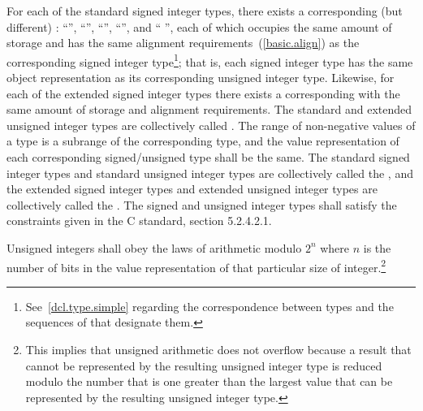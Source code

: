 \pnum
{}%
For each of the standard signed integer types,
there exists a corresponding (but different)
%
%
:
%
%
%
%
%
``'', ``'',
``'', ``'', and
``   '', each of
which occupies the same amount of storage and has the same alignment
requirements~(\ref{basic.align}) as the corresponding signed integer
type\footnote{See~\ref{dcl.type.simple} regarding the correspondence between types and
the sequences of  that designate them.};
that is, each signed integer type has the same object representation as
its corresponding unsigned integer type.
%
%
%
%
Likewise, for each of the extended signed integer types there exists a
corresponding  with the same amount of storage and alignment
requirements. The standard and extended unsigned integer types are
collectively called . The range of non-negative
values of a  type is a subrange of the corresponding
 type, and the value
representation of each corresponding signed/unsigned type shall be the
same.
%
%
%
%
The standard signed integer types and standard unsigned integer types
are collectively called the , and the extended
signed integer types and extended
unsigned integer types are collectively called the . The signed and unsigned integer types shall satisfy
the constraints given in the C standard, section 5.2.4.2.1.

\pnum
{}%
Unsigned integers shall obey the laws of arithmetic modulo $2^n$ where $n$ is
the number of bits in the value representation of that particular size of
integer.\footnote{This implies that
unsigned arithmetic does not overflow because a result
that cannot be represented by the resulting unsigned integer type is
reduced modulo the number that is one greater than the largest value
that can be represented by the resulting unsigned integer type.}

